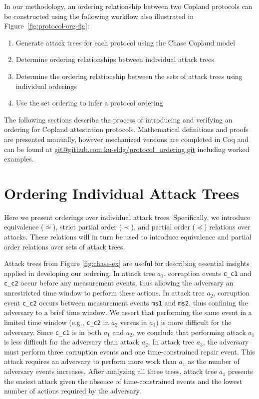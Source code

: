 \documentclass[runningheads]{llncs}
\theoremstyle{definition}
\newcommand{\squash}{\itemsep=0pt\parskip=0pt}
\begin{document}
In our methodology, an ordering relationship between two Copland
protocols can be constructed using the following workflow also
illustrated in Figure~\ref{fig:protocol-org-fig}:

\begin{enumerate}
  \squash
\item Generate attack trees for each protocol using the Chase Copland model
\item Determine ordering relationships between individual attack trees
\item Determine the ordering relationship between the sets of attack
  trees using individual orderings
\item Use the set ordering to infer a protocol ordering
\end{enumerate}

The following sections describe the process of introducing and
verifying an ordering for Copland attestation protocols. 
Mathematical definitions and proofs are presented manually, however
mechanized versions are completed in Coq and can be found at
\url{git@github.com:ku-sldg/protocol_ordering.git} including worked
examples. 

\section{Ordering Individual Attack Trees}

Here we present orderings over individual attack trees. Specifically,
we introduce equivalence ($\simeq$), strict partial order ($\prec$),
and partial order ($\preceq$) relations over attacks. These
relations will in turn be used to introduce equivalence and partial
order relations over sets of attack trees.

Attack trees from Figure \ref{fig:chase-ex} are useful for describing
essential insights applied in developing our ordering. In attack tree
$a_1$, corruption events \texttt{c\_c1} and \texttt{c\_c2} occur
before any measurement events, thus allowing the adversary an
unrestricted time window to perform these actions. In
attack tree $a_2$, corruption event \texttt{c\_c2} occurs between
measurement events \texttt{ms1} and \texttt{ms2}, thus confining the
adversary to a brief time window. We
assert that performing the same event in a limited time window (e.g.,
\texttt{c\_c2} in $a_2$ versus in $a_1$) is more difficult for the
adversary. Since \texttt{c\_c1} is in both $a_1$ and $a_2$, we
conclude that performing attack $a_1$ is less difficult for the
adversary than attack $a_2$.  In attack tree $a_3$, the adversary must
perform three corruption events and one time-constrained repair
event. This attack requires an adversary to perform more work than
$a_1$ as the number of adversary events increases. After analyzing all
three trees, attack tree $a_1$ presents the easiest attack given the
absence of time-constrained events and the lowest number of actions
required by the adversary.
\end{document}
